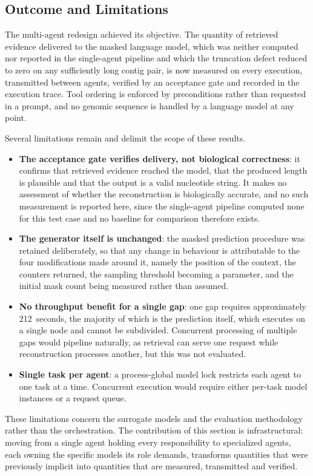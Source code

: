 \subsection{Outcome and Limitations}

The multi-agent redesign achieved its objective. The quantity of retrieved evidence delivered
to the masked language model, which was neither computed nor reported in the single-agent
pipeline and which the truncation defect reduced to zero on any sufficiently long contig pair,
is now measured on every execution, transmitted between agents, verified by an acceptance gate
and recorded in the execution trace. Tool ordering is enforced by preconditions rather than
requested in a prompt, and no genomic sequence is handled by a language model at any point.

Several limitations remain and delimit the scope of these results.

\begin{itemize}
    \item \textbf{The acceptance gate verifies delivery, not biological correctness}: it
    confirms that retrieved evidence reached the model, that the produced length is plausible
    and that the output is a valid nucleotide string. It makes no assessment of whether the
    reconstruction is biologically accurate, and no such measurement is reported here, since
    the single-agent pipeline computed none for this test case and no baseline for comparison
    therefore exists.

    \item \textbf{The generator itself is unchanged}: the masked prediction procedure was
    retained deliberately, so that any change in behaviour is attributable to the four
    modifications made around it, namely the position of the context, the counters returned,
    the sampling threshold becoming a parameter, and the initial mask count being measured
    rather than assumed.

    \item \textbf{No throughput benefit for a single gap}: one gap requires approximately
    212~seconds, the majority of which is the prediction itself, which executes on a single node
    and cannot be subdivided. Concurrent processing of multiple gaps would pipeline naturally,
    as retrieval can serve one request while reconstruction processes another, but this was not
    evaluated.

    \item \textbf{Single task per agent}: a process-global model lock restricts each agent to
    one task at a time. Concurrent execution would require either per-task model instances or a
    request queue.
\end{itemize}

These limitations concern the surrogate models and the evaluation methodology rather than the
orchestration. The contribution of this section is infrastructural: moving from a single agent
holding every responsibility to specialized agents, each owning the specific models its role
demands, transforms quantities that were previously implicit into quantities that are measured,
transmitted and verified.
